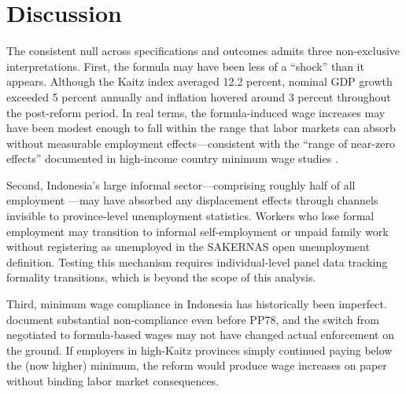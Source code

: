 \documentclass[12pt]{article}
\begin{document}



\section{Discussion}
\label{sec:discussion}

The consistent null across specifications and outcomes admits three non-exclusive interpretations. First, the formula may have been less of a ``shock'' than it appears. Although the Kaitz index averaged 12.2 percent, nominal GDP growth exceeded 5 percent annually and inflation hovered around 3 percent throughout the post-reform period. In real terms, the formula-induced wage increases may have been modest enough to fall within the range that labor markets can absorb without measurable employment effects---consistent with the ``range of near-zero effects'' documented in high-income country minimum wage studies \citep{dube2019minimum, cengiz2019effect}.

Second, Indonesia's large informal sector---comprising roughly half of all employment \citep{world2015indonesia}---may have absorbed any displacement effects through channels invisible to province-level unemployment statistics. Workers who lose formal employment may transition to informal self-employment or unpaid family work without registering as unemployed in the SAKERNAS open unemployment definition. Testing this mechanism requires individual-level panel data tracking formality transitions, which is beyond the scope of this analysis.

Third, minimum wage compliance in Indonesia has historically been imperfect. \citet{alatas2004does} document substantial non-compliance even before PP78, and the switch from negotiated to formula-based wages may not have changed actual enforcement on the ground. If employers in high-Kaitz provinces simply continued paying below the (now higher) minimum, the reform would produce wage increases on paper without binding labor market consequences.
\end{document}
